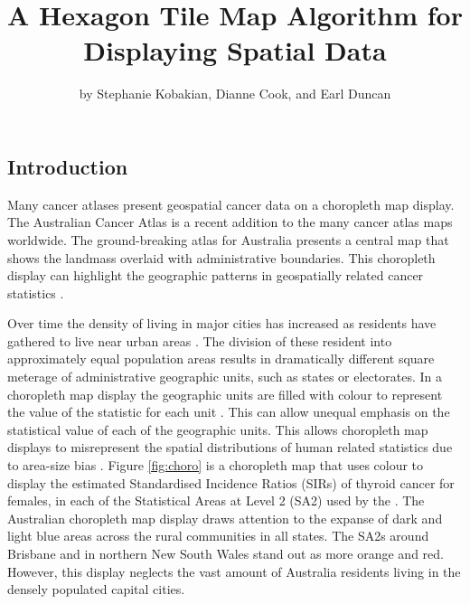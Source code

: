 \title{A Hexagon Tile Map Algorithm for Displaying Spatial Data}
\author{by Stephanie Kobakian, Dianne Cook, and Earl Duncan}

\maketitle


\hypertarget{introduction}{%
\subsection{Introduction}\label{introduction}}

Many cancer atlases present geospatial cancer data on a choropleth map
display. The Australian Cancer Atlas \citep{TACA} is a recent addition
to the many cancer atlas maps worldwide. The ground-breaking atlas for
Australia presents a central map that shows the landmass overlaid with
administrative boundaries. This choropleth display can highlight the
geographic patterns in geospatially related cancer statistics
\citep{SAMGIS}.

Over time the density of living in major cities has increased as
residents have gathered to live near urban areas \citep{ACTUC}. The
division of these resident into approximately equal population areas
results in dramatically different square meterage of administrative
geographic units, such as states or electorates. In a choropleth map
display the geographic units are filled with colour to represent the
value of the statistic for each unit \citep{EI}. This can allow unequal
emphasis on the statistical value of each of the geographic units. This
allows choropleth map displays to misrepresent the spatial distributions
of human related statistics due to area-size bias \citep{BCM}. Figure
\ref{fig:choro} is a choropleth map that uses colour to display the
estimated Standardised Incidence Ratios (SIRs) of thyroid cancer for
females, in each of the Statistical Areas at Level 2 (SA2) used by the
\citet{abs2011}. The Australian choropleth map display draws attention
to the expanse of dark and light blue areas across the rural communities
in all states. The SA2s around Brisbane and in northern New South Wales
stand out as more orange and red. However, this display neglects the
vast amount of Australia residents living in the densely populated
capital cities.

